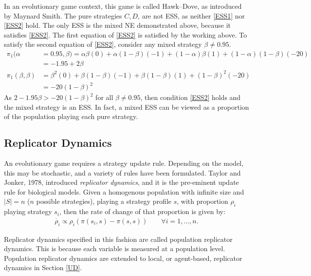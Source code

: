 In an evolutionary game context, this game is called Hawk--Dove, as introduced by Maynard Smith. The pure strategies $C,D$, are not ESS, as neither \eqref{ESS1} nor \eqref{ESS2} hold. The only ESS is the mixed NE demonstrated above, because it satisfies \eqref{ESS2}. The first equation of \eqref{ESS2} is satisfied by the working above. To satisfy the second equation of \eqref{ESS2}, consider any mixed strategy $\beta \neq 0.95$.  \\
\begin{align*}
    \pi_1(\alpha &= 0.95,\beta) = \alpha \beta (0) + \alpha(1-\beta)(-1)+ (1-\alpha)\beta(1) + (1-\alpha)(1-\beta)(-20) \\
    &= -1.95 + 2\beta\\
    \pi_1(\beta,\beta) &= \beta^2(0) + \beta(1-\beta)(-1) + \beta(1-\beta)(1) + (1-\beta)^2(-20)\\
    &= -20(1-\beta)^2
\end{align*}
As $2-1.95\beta> -20(1-\beta)^2$ for all $\beta \neq 0.95$, then condition \eqref{ESS2} holds and the mixed strategy is an ESS. In fact, a mixed ESS can be viewed as a proportion of the population playing each pure strategy.  



\subsection{Replicator Dynamics}
An evolutionary game requires a strategy update rule. Depending on the model, this may be stochastic, and a variety of rules have been formulated. Taylor and Jonker, 1978, introduced \emph{replicator dynamics}, and it is the pre-eminent update rule for biological models. Given a homogenous population with infinite size and $|S| = n$ ($n$ possible strategies), playing a strategy profile $s$, with proportion $\rho_i$ playing strategy $s_i$, then the rate of change of that proportion is given by: \\
\begin{align} \label{Replicator}
    \dot{\rho_i} \propto \rho_i(\pi(s_i, s) - \pi(s, s) ) \qquad\forall i = 1, \dots, n.
\end{align}

Replicator dynamics specified in this fashion are called population replicator dynamics. This is because each variable is measured at a population level. Population replicator dynamics are extended to local, or agent-based, replicator dynamics in Section \ref{UD}. 

